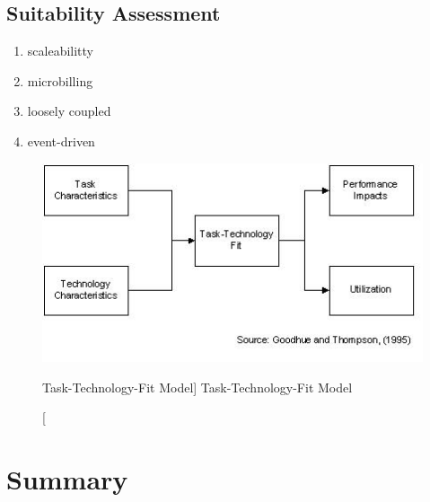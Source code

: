 \subsection{Suitability Assessment}

\begin{enumerate}
    \item scaleabilitty
    \item microbilling
    \item loosely coupled
    \item event-driven
\end{enumerate}


\begin{figure}[ht]
    \includegraphics[width=0.7\linewidth]{images/methodology/ttf.jpg}\centering
    \caption
    [Task-Technology-Fit Model]
    {Task-Technology-Fit Model \cite{Goodhue1995Task-TechnologyPerformance}}
\end{figure}


\section{Summary}
